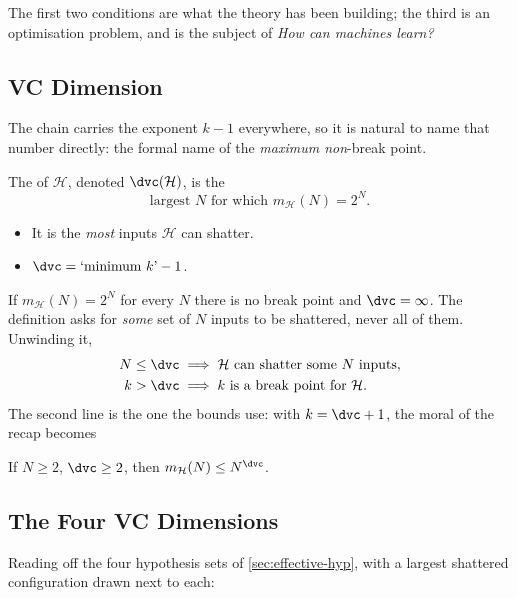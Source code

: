The first two conditions are what the theory has been building; the third is an
optimisation problem, and is the subject of \emph{How can machines learn?}

\subsection{VC Dimension}

The chain carries the exponent \(k - 1\) everywhere, so it is natural to name
that number directly: the formal name of the \emph{maximum non}-break point.

\begin{definition}[VC dimension]\label{def:vc}
    The  of \(\mathcal{H}\), denoted \(\dvc(\mathcal{H})\), is
    the
    \[
        \text{largest } N \text{ for which } m_{\mathcal{H}}(N) = 2^N .
    \]
    \begin{itemize}
        \item It is the \emph{most} inputs \(\mathcal{H}\) can shatter.
        \item \(\dvc = \text{`minimum } k\text{'} - 1\).
    \end{itemize}
\end{definition}

If \(m_{\mathcal{H}}(N) = 2^N\) for every \(N\) there is no break point and
\(\dvc = \infty\). The definition asks for \emph{some} set of \(N\) inputs to be
shattered, never all of them. Unwinding it,
\begin{align*}
    N \le \dvc &\implies \mathcal{H} \text{ can shatter some } N \text{ inputs},\\
    k > \dvc &\implies k \text{ is a break point for } \mathcal{H} .
\end{align*}
The second line is the one the bounds use: with \(k = \dvc + 1\), the moral of
the recap becomes

\begin{moral}
    If \(N \ge 2\), \(\dvc \ge 2\), then \(m_{\mathcal{H}}(N) \le N^{\dvc}\).
\end{moral}

\subsection{The Four VC Dimensions}

Reading off the four hypothesis sets of \autoref{sec:effective-hyp}, with a
largest shattered configuration drawn next to each:

